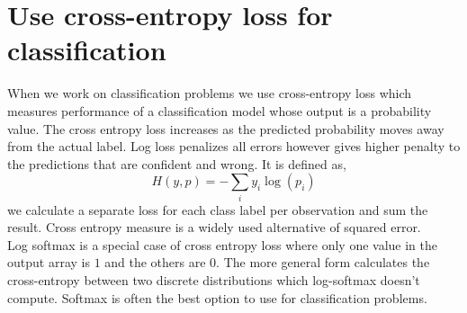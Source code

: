 {\centering{}\par}

\section{Use cross-entropy loss for classification}
When we work on classification problems we use cross-entropy loss which measures performance of a classification model whose output is a probability value. 
The cross entropy loss increases as the predicted probability moves away from the actual label. 
Log loss penalizes all errors however gives higher penalty to the predictions that are confident and wrong. 
It is defined as,
\begin{equation}
H(y, p)=-\sum_i y_i \log(p_i)
\end{equation}
we calculate a separate loss for each class label per observation and sum the result. 
Cross entropy measure is a widely used alternative of squared error.\\

Log softmax is a special case of cross entropy loss where only one value in the output array is $1$ and the others are $0$. 
The more general form calculates the cross-entropy between two discrete distributions which log-softmax doesn’t compute. 
Softmax is often the best option to use for classification problems. 

{\centering{}\par}
\vspace{5pt}


